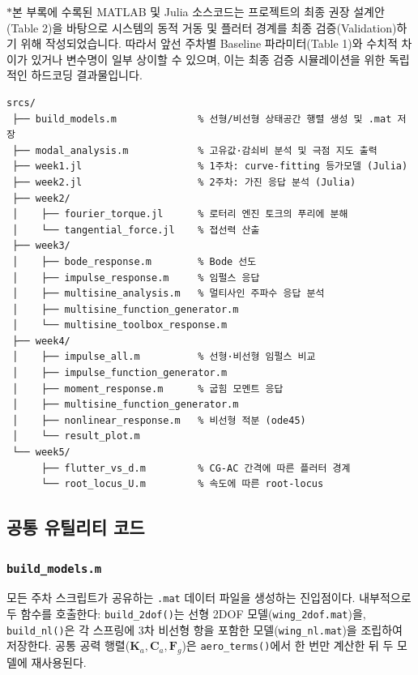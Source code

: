 \documentclass[
	a4paper, %
	10pt, %
]{CSUniSchoolLabReport}
\begin{document}
$\ast $본 부록에 수록된 MATLAB 및 Julia 소스코드는 프로젝트의 최종 권장 설계안(Table 2)을 바탕으로 시스템의 동적 거동 및 플러터 경계를 최종 
검증(Validation)하기 위해 작성되었습니다. 따라서 앞선 주차별 Baseline 파라미터(Table 1)와 수치적 차이가 있거나 변수명이 일부 상이할 수 있으며, 
이는 최종 검증 시뮬레이션을 위한 독립적인 하드코딩 결과물입니다.


\begin{small}
\begin{verbatim}
srcs/
 ├── build_models.m              % 선형/비선형 상태공간 행렬 생성 및 .mat 저장
 ├── modal_analysis.m            % 고유값·감쇠비 분석 및 극점 지도 출력
 ├── week1.jl                    % 1주차: curve-fitting 등가모델 (Julia)
 ├── week2.jl                    % 2주차: 가진 응답 분석 (Julia)
 ├── week2/
 │    ├── fourier_torque.jl      % 로터리 엔진 토크의 푸리에 분해
 │    └── tangential_force.jl    % 접선력 산출
 ├── week3/
 │    ├── bode_response.m        % Bode 선도
 │    ├── impulse_response.m     % 임펄스 응답
 │    ├── multisine_analysis.m   % 멀티사인 주파수 응답 분석
 │    ├── multisine_function_generator.m
 │    └── multisine_toolbox_response.m
 ├── week4/
 │    ├── impulse_all.m          % 선형·비선형 임펄스 비교
 │    ├── impulse_function_generator.m
 │    ├── moment_response.m      % 굽힘 모멘트 응답
 │    ├── multisine_function_generator.m
 │    ├── nonlinear_response.m   % 비선형 적분 (ode45)
 │    └── result_plot.m
 └── week5/
      ├── flutter_vs_d.m         % CG-AC 간격에 따른 플러터 경계
      └── root_locus_U.m         % 속도에 따른 root-locus
\end{verbatim}
\end{small}

\subsection{공통 유틸리티 코드}

\subsubsection{\texttt{build\_models.m}}
모든 주차 스크립트가 공유하는 \texttt{.mat} 데이터 파일을 생성하는 진입점이다.
내부적으로 두 함수를 호출한다:
\texttt{build\_2dof()}는 선형 2DOF 모델(\texttt{wing\_2dof.mat})을,
\texttt{build\_nl()}은 각 스프링에 3차 비선형 항을 포함한 모델(\texttt{wing\_nl.mat})을 조립하여 저장한다.
공통 공력 행렬(\(\mathbf{K}_a,\mathbf{C}_a,\mathbf{F}_g\))은 \texttt{aero\_terms()}에서 한 번만 계산한 뒤 두 모델에 재사용된다.
\end{document}
